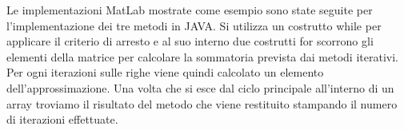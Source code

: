 \documentclass[12pt]{article}
\begin{document}
Le implementazioni MatLab mostrate come esempio sono state seguite per l'implementazione dei tre metodi in JAVA. Si utilizza un costrutto while per applicare il criterio di arresto e al suo interno due costrutti for scorrono gli elementi della matrice per calcolare la sommatoria prevista dai metodi iterativi. Per ogni iterazioni sulle righe viene quindi calcolato un elemento dell'approssimazione. Una volta che si esce dal ciclo principale all'interno di un array troviamo il risultato del metodo che viene restituito stampando il numero di iterazioni effettuate.
\end{document}
